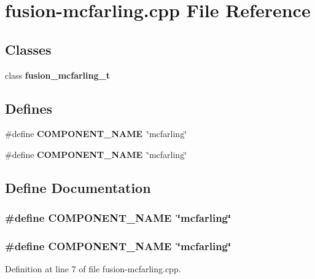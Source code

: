 \section{fusion-mcfarling.cpp File Reference}
\label{fusion-mcfarling_8cpp}
\subsection*{Classes}
\begin{CompactItemize}
\item 
class {\bf fusion\_\-mcfarling\_\-t}
\end{CompactItemize}
\subsection*{Defines}
\begin{CompactItemize}
\item 
\#define {\bf COMPONENT\_\-NAME}~\char`\"{}mcfarling\char`\"{}
\item 
\#define {\bf COMPONENT\_\-NAME}~\char`\"{}mcfarling\char`\"{}
\end{CompactItemize}


\subsection{Define Documentation}
\subsubsection[{COMPONENT\_\-NAME}]{\setlength{\rightskip}{0pt plus 5cm}\#define COMPONENT\_\-NAME~\char`\"{}mcfarling\char`\"{}}\label{zesto-bpred_8cpp_9146ade7ce24e3db226a973a59063892}


\subsubsection[{COMPONENT\_\-NAME}]{\setlength{\rightskip}{0pt plus 5cm}\#define COMPONENT\_\-NAME~\char`\"{}mcfarling\char`\"{}}\label{fusion-mcfarling_8cpp_9146ade7ce24e3db226a973a59063892}




Definition at line 7 of file fusion-mcfarling.cpp.
